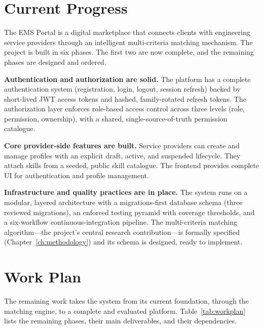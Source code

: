 \label{ch:conclusion}

\section{Current Progress}
The EMS Portal is a digital marketplace that connects clients with engineering
service providers through an intelligent multi-criteria matching mechanism. The
project is built in six phases. The first two are now complete, and the
remaining phases are designed and ordered.

\textbf{Authentication and authorization are solid.} The platform has a complete
authentication system (registration, login, logout, session refresh) backed by
short-lived JWT access tokens and hashed, family-rotated refresh tokens. The
authorization layer enforces role-based access control across three levels
(role, permission, ownership), with a shared, single-source-of-truth permission
catalogue.

\textbf{Core provider-side features are built.} Service providers can create and
manage profiles with an explicit draft, active, and suspended lifecycle. They
attach skills from a seeded, public skill catalogue. The frontend provides
complete UI for authentication and profile management.

\textbf{Infrastructure and quality practices are in place.} The system runs on a
modular, layered architecture with a migrations-first database schema (three
reviewed migrations), an enforced testing pyramid with coverage thresholds, and a
six-workflow continuous-integration pipeline. The multi-criteria matching
algorithm—the project's central research contribution—is formally specified
(Chapter~\ref{ch:methodology}) and its schema is designed, ready to
implement.

\section{Work Plan}
The remaining work takes the system from its current foundation, through the
matching engine, to a complete and evaluated platform. Table~\ref{tab:workplan}
lists the remaining phases, their main deliverables, and their dependencies.

